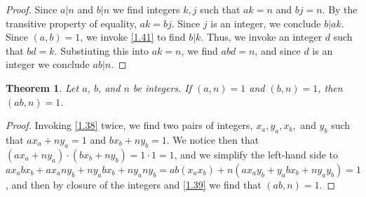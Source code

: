 \documentclass{article}
\newtheorem{thm}{Theorem}[section]
\numberwithin{equation}{thm}
\begin{document}
\begin{proof}
  Since $a | n$ and $b | n$ we find integers $k, j$ such that $ak = n$ and $bj = n$. By the transitive property of equality, $ak = bj$. Since $j$ is an integer, we conclude $b | ak$. Since $(a, b) = 1$, we invoke \ref{1.41} to find $b | k$. Thus, we invoke an integer $d$ such that $bd = k$. Substiuting this into $ak = n$, we find $abd = n$, and since $d$ is an integer we conclude $ab | n$.
\end{proof}



\begin{thm} \label{1.43}
  Let $a$, $b$, and $n$ be integers. If $(a,n) = 1$ and $(b, n) = 1$, then $(ab, n) = 1$.
\end{thm}

\begin{proof}
  Invoking \ref{1.38} twice, we find two pairs of integers, $x_a, y_a, x_b,$ and $y_b$ such that $ax_a + ny_a = 1$ and $bx_b + ny_b = 1$. We notice then that $(ax_a + ny_a) \cdot (bx_b + ny_b) = 1 \cdot 1 = 1$, and we simplify the left-hand side to $ax_abx_b + ax_any_b + ny_abx_b + ny_any_b = ab(x_a x_b) + n(ax_a y_b + y_a b x_b + ny_a y_b) = 1$, and then by closure of the integers and \ref{1.39} we find that $(ab, n) = 1$.
\end{proof}
\end{document}
